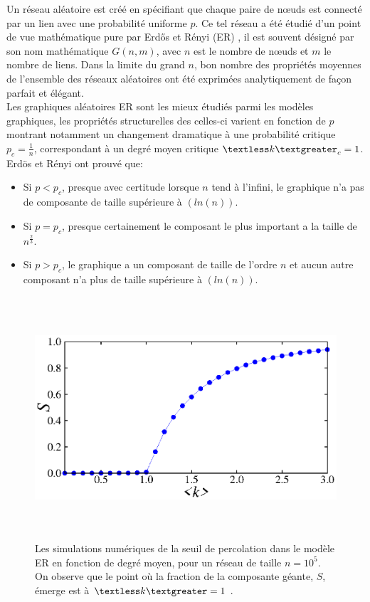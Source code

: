  Un réseau aléatoire est créé en spécifiant que chaque paire de nœuds est connecté par un lien avec une probabilité uniforme $p$. Ce tel réseau a été étudié d'un point de vue mathématique pure par Erd\H{o}s et Rényi (ER) \cite{Erdos-Renyi1959,Erdos-Renyi1960,Erdos-Renyi1961}, il est souvent désigné par son nom mathématique $G(n,m)$, avec $n$ est le nombre de nœuds et $m$ le nombre de liens. 
 Dans la limite du grand $n$, bon nombre des propriétés moyennes de l'ensemble des réseaux aléatoires ont été exprimées analytiquement de façon parfait et élégant.\\
 Les graphiques aléatoires ER sont les mieux étudiés parmi les modèles graphiques, les propriétés structurelles des celles-ci varient en fonction de $p$ montrant notamment un changement dramatique à une probabilité critique $p_c=\frac{1}{n}$,
 correspondant à un degré moyen critique $\textless k \textgreater_c=1$. Erdös et Rényi ont prouvé que:\\
 \begin{itemize}
  \item Si $p <p_c$, presque avec certitude lorsque $n$ tend à l'infini, le graphique n'a pas de composante de taille  
  supérieure à $(ln(n))$.
  \item Si $p=p_c$, presque certainement le composant le plus important a la taille de $n^{\frac{2}{3}}$.
  \item Si $p> p_c$, le graphique a un composant de taille de l'ordre $n$ et aucun autre composant n'a plus de taille
  supérieure à $(ln(n))$.
 \end{itemize}
\begin{figure}[h!]
	\centering
	\includegraphics[width=12cm,height=9cm]{./figures/fig-ER-CG}
	\caption{Les simulations numériques de la seuil de percolation dans le modèle ER en fonction de degré moyen, pour un réseau de taille $n=10^5$. On observe que le point où la fraction de la composante géante, $S$, émerge est à $\textless k\textgreater=1$ .}
	
	\label{percolation-graph}
\end{figure}


